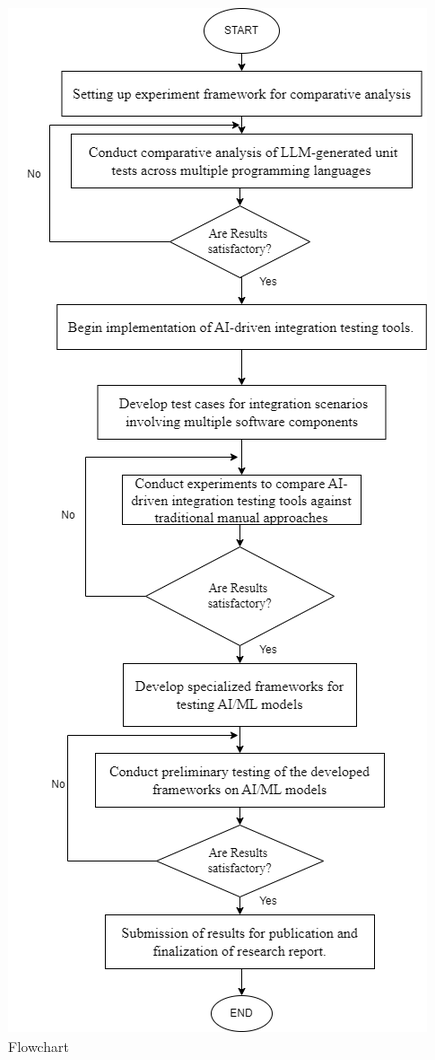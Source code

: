 \documentclass[12pt,a4paper]{article}
\begin{document}
\begin{figure}
    \centering
    \label{fig:Flowchart}
    \includegraphics[width=0.5\linewidth]{research.drawio (1).png}
    \caption{Flowchart}
    
\end{figure}
\newpage
\end{document}
